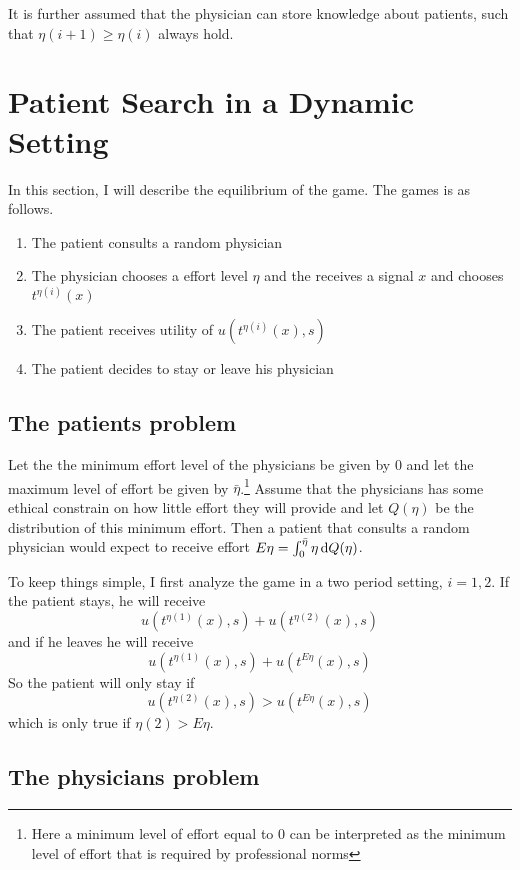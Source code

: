 It is further assumed that the physician can store knowledge about patients, such that $\eta(i+1)\geq\eta(i)$ always hold. 

\section{Patient Search in a Dynamic Setting} %
\label{sec:patient_search_in_a_dynamic_setting}
In this section, I will describe the equilibrium of the game. The games is as follows. 
\begin{enumerate}
    \item The patient consults a random physician
    \item The physician chooses a effort level $\eta$ and the receives a signal $x$ and chooses $t^{\eta(i)}(x)$
    \item The patient receives utility of $u(t^{\eta(i)}(x),s)$
    \item The patient decides to stay or leave his physician
\end{enumerate}

\subsection{The patients problem} %
\label{sub:the_patients_problem}
Let the the minimum effort level of the physicians be given by $0$ and let the maximum level of effort be given by $\bar{\eta}$.\footnote{Here a minimum level of effort equal to 0 can be interpreted as the minimum level of effort that is required by professional norms} Assume that the physicians has some ethical constrain on how little effort they will provide and let $Q(\eta)$ be the distribution of this minimum effort. Then a patient that consults a random physician would expect to receive effort $E\eta=\int_0^{\bar{\eta}}\eta \dif Q(\eta)$. 

To keep things simple, I first analyze the game in a two period setting, $i=1,2$. If the patient stays, he will receive 
\[
    u(t^{\eta(1)}(x),s)+u(t^{\eta(2)}(x),s)
\]
 and if he leaves he will receive
 \[
     u(t^{\eta(1)}(x),s)+u(t^{E\eta}(x),s)
 \]
 So the patient will only stay if 
 \[
    u(t^{\eta(2)}(x),s)>u(t^{E\eta}(x),s)
 \]
 which is only true if $\eta(2)>E\eta$.

\subsection{The physicians problem} %
\label{sub:the_physicians_problem}

